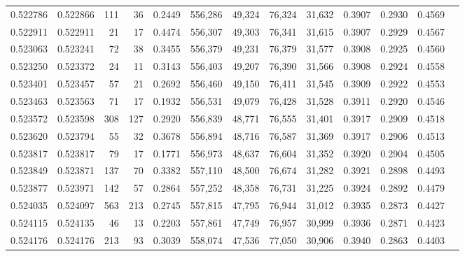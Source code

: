 \begin{tabular}{rrrrrrrrrrrrr}
0.522786 & 0.522866 &   111 &    36 &                                     0.2449 & 556,286 &  49,324 &  76,324 &  31,632 & 0.3907 & 0.2930 & 0.4569 \\
0.522911 & 0.522911 &    21 &    17 &                                     0.4474 & 556,307 &  49,303 &  76,341 &  31,615 & 0.3907 & 0.2929 & 0.4567 \\
0.523063 & 0.523241 &    72 &    38 &                                     0.3455 & 556,379 &  49,231 &  76,379 &  31,577 & 0.3908 & 0.2925 & 0.4560 \\
0.523250 & 0.523372 &    24 &    11 &                                     0.3143 & 556,403 &  49,207 &  76,390 &  31,566 & 0.3908 & 0.2924 & 0.4558 \\
0.523401 & 0.523457 &    57 &    21 &                                     0.2692 & 556,460 &  49,150 &  76,411 &  31,545 & 0.3909 & 0.2922 & 0.4553 \\
0.523463 & 0.523563 &    71 &    17 &                                     0.1932 & 556,531 &  49,079 &  76,428 &  31,528 & 0.3911 & 0.2920 & 0.4546 \\
0.523572 & 0.523598 &   308 &   127 &                                     0.2920 & 556,839 &  48,771 &  76,555 &  31,401 & 0.3917 & 0.2909 & 0.4518 \\
0.523620 & 0.523794 &    55 &    32 &                                     0.3678 & 556,894 &  48,716 &  76,587 &  31,369 & 0.3917 & 0.2906 & 0.4513 \\
0.523817 & 0.523817 &    79 &    17 &                                     0.1771 & 556,973 &  48,637 &  76,604 &  31,352 & 0.3920 & 0.2904 & 0.4505 \\
0.523849 & 0.523871 &   137 &    70 &                                     0.3382 & 557,110 &  48,500 &  76,674 &  31,282 & 0.3921 & 0.2898 & 0.4493 \\
0.523877 & 0.523971 &   142 &    57 &                                     0.2864 & 557,252 &  48,358 &  76,731 &  31,225 & 0.3924 & 0.2892 & 0.4479 \\
0.524035 & 0.524097 &   563 &   213 &                                     0.2745 & 557,815 &  47,795 &  76,944 &  31,012 & 0.3935 & 0.2873 & 0.4427 \\
0.524115 & 0.524135 &    46 &    13 &                                     0.2203 & 557,861 &  47,749 &  76,957 &  30,999 & 0.3936 & 0.2871 & 0.4423 \\
0.524176 & 0.524176 &   213 &    93 &                                     0.3039 & 558,074 &  47,536 &  77,050 &  30,906 & 0.3940 & 0.2863 & 0.4403 \\

\end{tabular}

